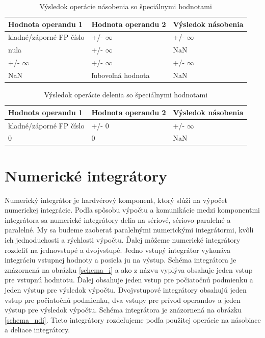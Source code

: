 \begin{table}[h]
\centering
\begin{tabular}{|l|l|l|}
\hline
\rowcolor[HTML]{C0C0C0} 
Hodnota operandu 1 & Hodnota operandu 2 & Výsledok násobenia \\ \hline
kladné/záporné FP číslo & +/- $ \infty $ & +/- $ \infty $ \\ \hline
nula           & +/- $ \infty $ & NaN \\ \hline
+/- $ \infty $ & +/- $ \infty $ & +/- $ \infty $ \\ \hline
NaN & ľubovoľná hodnota & NaN \\ \hline
\end{tabular}
\caption{Výsledok operácie násobenia so špeciálnymi hodnotami}
\label{special_nasobenie}
\end{table}

\begin{table}[h]
\centering
\begin{tabular}{|l|l|l|}
\hline
\rowcolor[HTML]{C0C0C0} 
Hodnota operandu 1 & Hodnota operandu 2 & Výsledok násobenia \\ \hline
kladné/záporné FP číslo & +/- 0 & +/- $ \infty $ \\ \hline
0 & 0 & NaN \\ \hline
\end{tabular}
\caption{Výsledok operácie delenia so špeciálnymi hodnotami}
\label{special_delenie}
\end{table}

\chapter{Numerické integrátory} \label{NUM_INTEGRATORY}
Numerický integrátor je hardvérový komponent, ktorý slúži na výpočet numerickej integrácie. Podľa spôsobu výpočtu a komunikácie medzi komponentmi integrátora sa numerické integrátory delia na sériové, sériovo-paralelné a paralelné. My sa budeme zaoberať paralelnými numerickými integrátormi, kvôli ich jednoduchosti a rýchlosti výpočtu. Ďalej môžeme numerické integrátory rozdeliť na jednovstupé a dvojvstupé. Jedno vstupý integrátor vykonáva integráciu vstupnej hodnoty a posiela ju na výstup. Schéma integrátora je znázornená na obrázku \ref{schema_i} a ako z názvu vyplýva obsahuje jeden vstup pre vstupnú hodntotu. Ďalej obsahuje jeden vstup pre počiatočnú podmienku a jeden výstup pre výsledok výpočtu. Dvojvstupové integrátory obsahujú jeden vstup pre počiatočnú podmienku, dva vstupy pre prívod operandov a jeden výstup pre výsledok výpočtu. Schéma integrátora je znázornená na obrázku \ref{schema_ndi}. Tieto integrátory rozdeľujeme podľa použitej operácie na násobiace a deliace integrátory.


